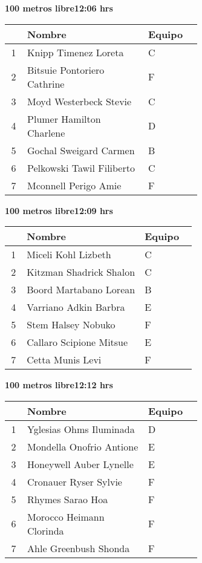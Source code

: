 \begin{minipage}{0.95\linewidth}
\begin{center}
\textbf{
100 metros libre\hspace{1cm}12:06 hrs}
\end{center}
\begin{tabular}{cp{0.63\linewidth}l}
\hline
& \textbf{Nombre} & \textbf{Equipo} \\ \hline
1 & Knipp Timenez Loreta & C \\ 
2 & Bitsuie Pontoriero Cathrine & F \\ 
3 & Moyd Westerbeck Stevie & C \\ 
4 & Plumer Hamilton Charlene & D \\ 
5 & Gochal Sweigard Carmen & B \\ 
6 & Pelkowski Tawil Filiberto & C \\ 
7 & Mconnell Perigo Amie & F \\ 
\end{tabular}
\end{minipage}
\begin{minipage}{0.95\linewidth}
\begin{center}
\textbf{
100 metros libre\hspace{1cm}12:09 hrs}
\end{center}
\begin{tabular}{cp{0.63\linewidth}l}
\hline
& \textbf{Nombre} & \textbf{Equipo} \\ \hline
1 & Miceli Kohl Lizbeth & C \\ 
2 & Kitzman Shadrick Shalon & C \\ 
3 & Boord Martabano Lorean & B \\ 
4 & Varriano Adkin Barbra & E \\ 
5 & Stem Halsey Nobuko & F \\ 
6 & Callaro Scipione Mitsue & E \\ 
7 & Cetta Munis Levi & F \\ 
\end{tabular}
\end{minipage}
\begin{minipage}{0.95\linewidth}
\begin{center}
\textbf{
100 metros libre\hspace{1cm}12:12 hrs}
\end{center}
\begin{tabular}{cp{0.63\linewidth}l}
\hline
& \textbf{Nombre} & \textbf{Equipo} \\ \hline
1 & Yglesias Ohms Iluminada & D \\ 
2 & Mondella Onofrio Antione & E \\ 
3 & Honeywell Auber Lynelle & E \\ 
4 & Cronauer Ryser Sylvie & F \\ 
5 & Rhymes Sarao Hoa & F \\ 
6 & Morocco Heimann Clorinda & F \\ 
7 & Ahle Greenbush Shonda & F \\ 
\end{tabular}
\end{minipage}
